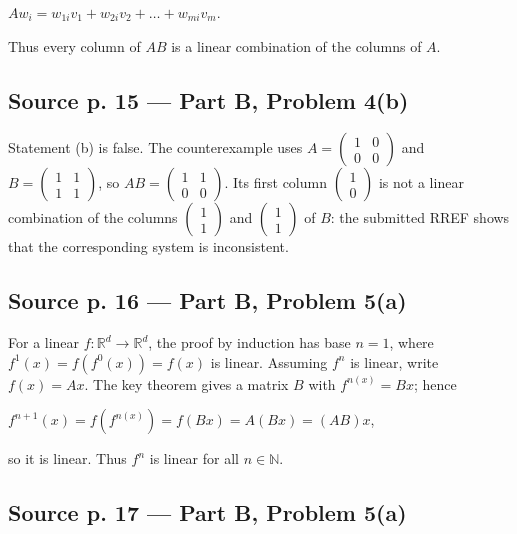 \(Aw_{i} = w_{1i}v_{1} + w_{2i}v_{2} + \ldots + w_{mi}v_{m}\).

Thus every column of \(AB\) is a linear combination of the columns of \(A\).

\subsection{Source p. 15 --- Part B, Problem 4(b)}

Statement (b) is false. The counterexample uses \(A = \begin{pmatrix}
1 & 0 \\
0 & 0
\end{pmatrix}\) and \(B = \begin{pmatrix}
1 & 1 \\
1 & 1
\end{pmatrix}\), so \(AB = \begin{pmatrix}
1 & 1 \\
0 & 0
\end{pmatrix}\). Its first column \(\begin{pmatrix}
1 \\
0
\end{pmatrix}\) is not a linear combination of the columns \(\begin{pmatrix}
1 \\
1
\end{pmatrix}\) and \(\begin{pmatrix}
1 \\
1
\end{pmatrix}\) of \(B\): the submitted RREF shows that the corresponding system is inconsistent.

\subsection{Source p. 16 --- Part B, Problem 5(a)}

For a linear \(f:\mathbb{R}^{d}\rightarrow\mathbb{R}^{d}\), the proof by induction has base \(n = 1\), where \(f^{1}(x) = f\left( {f^{0}(x)} \right) = f(x)\) is linear. Assuming \(f^{n}\) is linear, write \(f(x) = Ax\). The key theorem gives a matrix \(B\) with \(f^{n{(x)}} = Bx\); hence

\(f^{n + 1}(x) = f\left( f^{n{(x)}} \right) = f\left( {Bx} \right) = A\left( {Bx} \right) = \left( {AB} \right)x\),

so it is linear. Thus \(f^{n}\) is linear for all \(n \in \mathbb{N}\).

\subsection{Source p. 17 --- Part B, Problem 5(a)}

